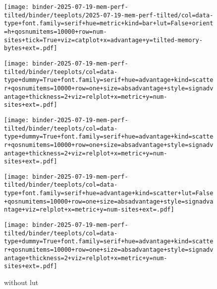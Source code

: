 \begin{figure*}

\begin{subfigure}{\textwidth}
\texttt{[image: binder-2025-07-19-mem-perf-tilted/binder/teeplots/2025-07-19-mem-perf-tilted/col=data-type+font.family=serif+hue=metric+kind=bar+lut=False+orient=h+qosnumitems=10000+row=num-sites+tick=True+viz=catplot+x=advantage+y=tilted-memory-bytes+ext=.pdf]}

\vspace{-1ex}

\texttt{[image: binder-2025-07-19-mem-perf-tilted/binder/teeplots/col=data-type+dummy=True+font.family=serif+hue=advantage+kind=scatter+qosnumitems=10000+row=one+size=absadvantage+style=signadvantage+thickness=2+viz=relplot+x=metric+y=num-sites+ext=.pdf]}

\vspace{-3ex}

\texttt{[image: binder-2025-07-19-mem-perf-tilted/binder/teeplots/col=data-type+dummy=True+font.family=serif+hue=advantage+kind=scatter+qosnumitems=10000+row=one+size=absadvantage+style=signadvantage+thickness=2+viz=relplot+x=metric+y=num-sites+ext=.pdf]}

\vspace{-1.2ex}

\texttt{[image: binder-2025-07-19-mem-perf-tilted/binder/teeplots/col=data-type+font.family=serif+hue=advantage+kind=scatter+lut=False+qosnumitems=10000+row=one+size=absadvantage+style=signadvantage+viz=relplot+x=metric+y=num-sites+ext=.pdf]}

\vspace{-2.8ex}

\texttt{[image: binder-2025-07-19-mem-perf-tilted/binder/teeplots/col=data-type+dummy=True+font.family=serif+hue=advantage+kind=scatter+qosnumitems=10000+row=one+size=absadvantage+style=signadvantage+thickness=2+viz=relplot+x=metric+y=num-sites+ext=.pdf]}

\vspace{-1.5ex}

\caption{without lut}
\label{fig:mem-perf-tilted:nolut}
\end{subfigure}

\begin{subfigure}{\textwidth}


\end{subfigure}
\end{figure*}
